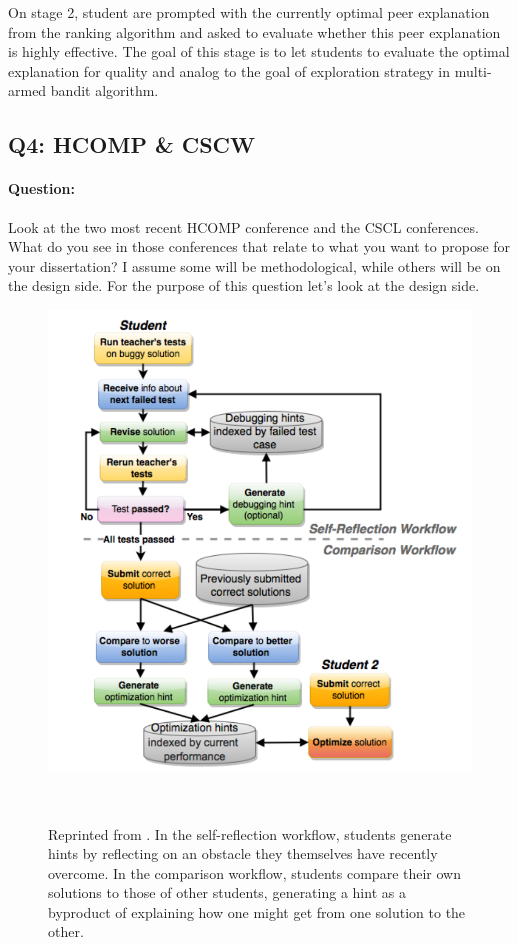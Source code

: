 \documentclass{article}
\begin{document}
On stage 2, student are prompted with the currently optimal peer explanation
from the ranking algorithm and asked to evaluate whether this peer
explanation is highly effective. The goal of this stage is to let
students to evaluate the optimal explanation for quality and analog to
the goal of exploration strategy in multi-armed bandit algorithm.

\subsection{Q4: HCOMP \& CSCW}
\paragraph{Question:} Look at the two most recent  HCOMP conference and
the CSCL conferences.   What do you see in those conferences that
relate to what you want to propose for your dissertation?   I assume
some will be methodological, while others will be on the design side.
For the purpose of this question let's look at the design side. \\
[0.1 in]

\begin{figure}[h]
  \centering
  \includegraphics[width=0.75\columnwidth]{learnersourcing.png}
  \caption{Reprinted from \cite{Glassman2016-yy}. In the
    self-reflection workflow, students generate hints by reflecting on
  an obstacle they themselves have recently overcome. In the
  comparison workflow, students compare their own solutions to those
  of other students, generating a hint as a byproduct of explaining
  how one might get from one solution to the other.}
  ~\label{fg:learnersourcing-model}
\end{figure}
\end{document}

